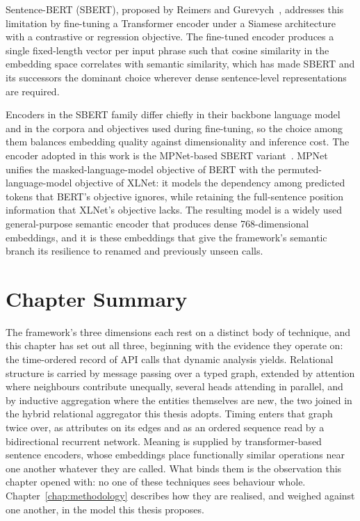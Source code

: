\documentclass[%
    BCOR=10mm,
    DIV=13,
    toc=bibliography,
    toc=listof,
    oneside,
    12pt,
]{scrbook}
\begin{document}
Sentence-BERT (SBERT), proposed by Reimers and Gurevych~\cite{reimers2019sbert},
addresses this limitation by fine-tuning a Transformer encoder under a Siamese
architecture with a contrastive or regression objective. The fine-tuned encoder
produces a single fixed-length vector per input phrase such that cosine similarity
in the embedding space correlates with semantic similarity, which has made SBERT
and its successors the dominant choice wherever dense sentence-level
representations are required.

Encoders in the SBERT family differ chiefly in their backbone language model and
in the corpora and objectives used during fine-tuning, so the choice among them
balances embedding quality against dimensionality and inference cost. The
encoder adopted in this work is the MPNet-based SBERT
variant~\cite{mpnet2020}. MPNet unifies the masked-language-model objective of
BERT with the permuted-language-model objective of XLNet: it models the
dependency among predicted tokens that BERT's objective ignores, while
retaining the full-sentence position information that XLNet's objective lacks.
The resulting model is a widely used general-purpose semantic encoder that
produces dense 768-dimensional embeddings, and it is these embeddings that give
the framework's semantic branch its resilience to renamed and previously unseen
calls.

\section{Chapter Summary}
\label{sec:theory_summary}

The framework's three dimensions each rest on a distinct body of technique,
and this chapter has set out all three, beginning with the evidence they
operate on: the time-ordered record of API calls that dynamic analysis yields.
Relational structure is carried by message passing over a typed graph,
extended by attention where neighbours contribute unequally, several heads
attending in parallel, and by inductive aggregation where the entities
themselves are new, the two joined in the hybrid relational aggregator this
thesis adopts. Timing enters that graph twice over, as attributes on its edges
and as an ordered sequence read by a bidirectional recurrent network. Meaning
is supplied by transformer-based sentence encoders, whose embeddings place
functionally similar operations near one another whatever they are called.
What binds them is the observation this chapter opened with: no one of these
techniques sees behaviour whole. Chapter~\ref{chap:methodology} describes how
they are realised, and weighed against one another, in the model this thesis
proposes.
\end{document}
